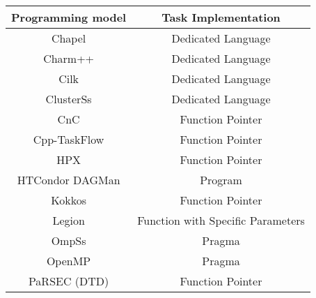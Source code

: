 \begin{tabular}{cc}
\hline
Programming model & Task Implementation \\
\hline
Chapel & Dedicated Language\\
Charm++ & Dedicated Language\\
Cilk & Dedicated Language\\
ClusterSs & Dedicated Language\\
CnC & Function Pointer\\
Cpp-TaskFlow & Function Pointer\\
HPX & Function Pointer\\
HTCondor DAGMan & Program\\
Kokkos & Function Pointer\\
Legion & Function with Specific Parameters\\
OmpSs & Pragma\\
OpenMP & Pragma\\
PaRSEC (DTD) & Function Pointer\\
\hline
\end{tabular}
